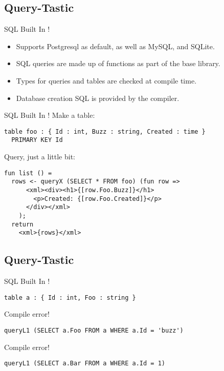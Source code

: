 \documentclass{beamer}
\begin{document}
\subsection{Query-Tastic}
\begin{frame}{SQL Built In !}

\begin{itemize}
\item Supports Postgresql as default, as well as MySQL, and SQLite.
\item SQL queries are made up of functions as part of the base library.
\item Types for queries and tables are checked at compile time.
\item Database creation SQL is provided by the compiler.
\end{itemize}
\end{frame}
\begin{frame}[fragile]{SQL Built In !}
Make a table:
\begin{verbatim}
table foo : { Id : int, Buzz : string, Created : time }
  PRIMARY KEY Id
\end{verbatim}
Query, just a little bit:
\begin{verbatim}
fun list () =
  rows <- queryX (SELECT * FROM foo) (fun row => 
      <xml><div><h1>{[row.Foo.Buzz]}</h1>
        <p>Created: {[row.Foo.Created]}</p>
      </div></xml>
    );
  return
    <xml>{rows}</xml>
\end{verbatim}
\end{frame}

\subsection{Query-Tastic}
\begin{frame}[fragile]{SQL Built In !}
\begin{verbatim}
table a : { Id : int, Foo : string }
\end{verbatim}
Compile error!
\begin{verbatim}
queryL1 (SELECT a.Foo FROM a WHERE a.Id = 'buzz')
\end{verbatim}
Compile error!
\begin{verbatim}
queryL1 (SELECT a.Bar FROM a WHERE a.Id = 1)
\end{verbatim}
\end{frame}
\end{document}
